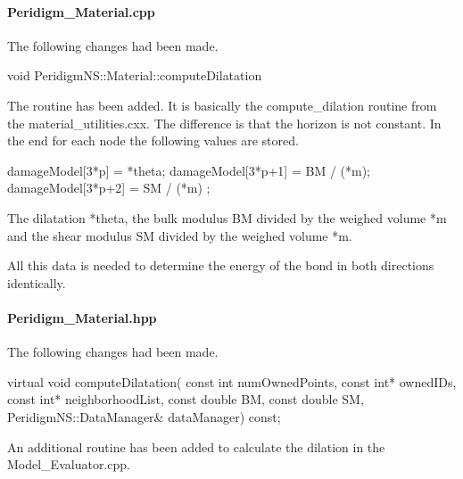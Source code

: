 \paragraph{Peridigm\_Material.cpp}
The following changes had been made.
\begin{code}
void
PeridigmNS::Material::computeDilatation
\end{code} 
The routine has been added. It is basically the compute\_dilation routine from the material\_utilities.cxx. The difference is that the horizon is not constant. In the end for each node the following values are stored.
\begin{code}
damageModel[3*p] = *theta;
damageModel[3*p+1] = BM / (*m);
damageModel[3*p+2] = SM / (*m) ;
\end{code} 
The dilatation *theta, the bulk modulus BM divided by the weighed volume *m and the shear modulus SM divided by the weighed volume *m.

All this data is needed to determine the energy of the bond in both directions identically.
\paragraph{Peridigm\_Material.hpp}
The following changes had been made.
\begin{code}
virtual void
computeDilatation(
   const int numOwnedPoints,
   const int* ownedIDs,
   const int* neighborhoodList,
   const double BM,
   const double SM,
   PeridigmNS::DataManager& dataManager) const;
\end{code}
An additional routine has been added to calculate the dilation in the Model\_Evaluator.cpp.
